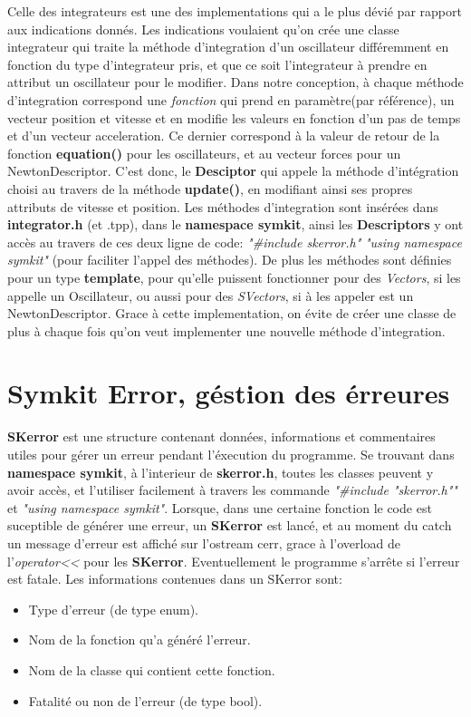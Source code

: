 \documentclass{report}
\begin{document}
Celle des integrateurs est une des implementations qui a le plus dévié par rapport aux indications donnés.
Les indications voulaient qu'on crée une classe integrateur qui traite la méthode d'integration d'un oscillateur différemment
en fonction du type d'integrateur pris, et que ce soit l'integrateur à prendre en attribut un oscillateur pour le modifier.
Dans notre conception, à chaque méthode d'integration correspond une \textit{fonction} qui prend en paramètre(par référence), un vecteur position et vitesse
et en modifie les valeurs en fonction d'un pas de temps et d'un vecteur acceleration.
Ce dernier correspond à la valeur de retour de la fonction \textbf{equation()} pour les oscillateurs, et au vecteur forces pour un NewtonDescriptor.
C'est donc, le \textbf{Desciptor} qui appele la méthode d'intégration choisi au travers de la méthode \textbf{update()}, en modifiant ainsi ses propres attributs de vitesse et position.
Les méthodes d'integration sont insérées dans \textbf{integrator.h} (et .tpp), dans le \textbf{namespace symkit}, ainsi les \textbf{Descriptors} y ont accès au travers de ces deux ligne de code: 
\textit{"\#include skerror.h"}
\textit{"using namespace symkit"} (pour faciliter l'appel des méthodes).
De plus les méthodes sont définies pour un type \textbf{template}, pour qu'elle puissent fonctionner pour des \textit{Vectors}, si les appelle un Oscillateur,
ou aussi pour des \textit{SVectors}, si à les appeler est un NewtonDescriptor.
Grace à cette implementation, on évite de créer une classe de plus à chaque fois qu'on veut implementer une nouvelle méthode d'integration.


\section{Symkit Error, géstion des érreures}

\textbf{SKerror} est une structure contenant données, informations et commentaires utiles pour gérer un erreur pendant l'éxecution du programme.
Se trouvant dans \textbf{namespace symkit}, à l'interieur de \textbf{skerror.h}, toutes les classes peuvent y avoir accès, et l'utiliser facilement
à travers les commande \textit{"\#include "skerror.h""} et \textit{"using namespace symkit"}.
Lorsque, dans une certaine fonction le code est suceptible de générer une erreur, un \textbf{SKerror} est lancé, et au moment du catch
un message d'erreur est affiché sur l'ostream cerr, grace à l'overload de l'\textit{operator<<} pour les \textbf{SKerror}.
Eventuellement le programme s'arrête si l'erreur est fatale.
Les informations contenues dans un SKerror sont:
\begin{itemize}
\item Type d'erreur (de type enum).
\item Nom de la fonction qu'a généré l'erreur.
\item Nom de la classe qui contient cette fonction.
\item Fatalité ou non de l'erreur (de type bool).
\end{itemize}
\end{document}
